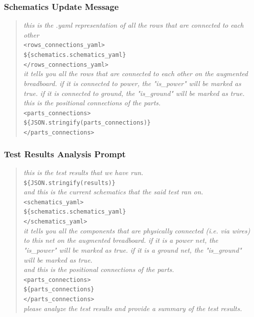 \subsubsection{Schematics Update Message}
\begin{quote}
\textit{this is the .yaml representation of all the rows that are connected to each other}\\
\texttt{<rows\_connections\_yaml>}\\
\texttt{\$\{schematics.schematics\_yaml\}}\\
\texttt{</rows\_connections\_yaml>}\\
\textit{it tells you all the rows that are connected to each other on the augmented breadboard. if it is connected to power, the "is\_power" will be marked as true. if it is connected to ground, the "is\_ground" will be marked as true.}\\
\textit{this is the positional connections of the parts.}\\
\texttt{<parts\_connections>}\\
\texttt{\$\{JSON.stringify(parts\_connections)\}}\\
\texttt{</parts\_connections>}
\end{quote}

\subsubsection{Test Results Analysis Prompt}
\begin{quote}
\textit{this is the test results that we have run.}\\
\texttt{\$\{JSON.stringify(results)\}}\\
\textit{and this is the current schematics that the said test ran on.}\\
\texttt{<schematics\_yaml>}\\
\texttt{\$\{schematics.schematics\_yaml\}}\\
\texttt{</schematics\_yaml>}\\
\textit{it tells you all the components that are physically connected (i.e. via wires) to this net on the augmented breadboard. if it is a power net, the "is\_power" will be marked as true. if it is a ground net, the "is\_ground" will be marked as true.}\\
\textit{and this is the positional connections of the parts.}\\
\texttt{<parts\_connections>}\\
\texttt{\$\{parts\_connections\}}\\
\texttt{</parts\_connections>}\\
\textit{please analyze the test results and provide a summary of the test results.}
\end{quote}

